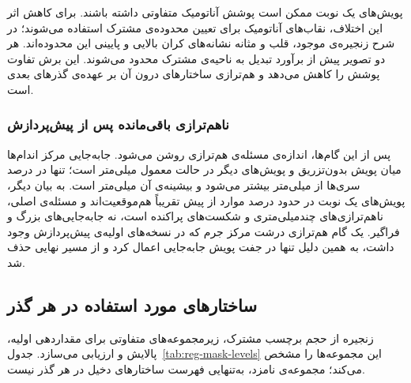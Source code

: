 پویش‌های یک نوبت ممکن است پوشش آناتومیک متفاوتی داشته باشند. برای کاهش اثر این اختلاف، نقاب‌های آناتومیک برای تعیین محدوده‌ی مشترک استفاده می‌شوند؛ در شرح زنجیره‌ی موجود، قلب و مثانه نشانه‌های کران بالایی و پایینی این محدوده‌اند. هر دو تصویر پیش از برآورد تبدیل به ناحیه‌ی مشترک محدود می‌شوند. این برش تفاوت پوشش را کاهش می‌دهد و هم‌ترازی ساختارهای درون آن بر عهده‌ی گذرهای بعدی است.

\subsubsection*{ناهم‌ترازی باقی‌مانده پس از پیش‌پردازش}

پس از این گام‌ها، اندازه‌ی مسئله‌ی هم‌ترازی روشن می‌شود. جابه‌جایی مرکز اندام‌ها میان پویش بدون‌تزریق و پویش‌های دیگر در حالت معمول  میلی‌متر است؛ تنها در  درصد سری‌ها از  میلی‌متر بیشتر می‌شود و بیشینه‌ی آن  میلی‌متر است. به بیان دیگر، پویش‌های یک نوبت در حدود  درصد موارد از پیش تقریباً هم‌موقعیت‌اند و مسئله‌ی اصلی، ناهم‌ترازی‌های چندمیلی‌متری و شکست‌های پراکنده است، نه جابه‌جایی‌های بزرگ و فراگیر. یک گام هم‌ترازی درشت مرکز جرم که در نسخه‌های اولیه‌ی پیش‌پردازش وجود داشت، به همین دلیل تنها در  جفت پویش جابه‌جایی اعمال کرد و از مسیر نهایی حذف شد.

\subsection{ساختارهای مورد استفاده در هر گذر}
\label{sec:m-reg-mask}

زنجیره از حجم برچسب مشترک، زیرمجموعه‌های متفاوتی برای مقداردهی اولیه، پالایش و ارزیابی می‌سازد. جدول~\ref{tab:reg-mask-levels} این مجموعه‌ها را مشخص می‌کند؛ مجموعه‌ی نامزد، به‌تنهایی فهرست ساختارهای دخیل در هر گذر نیست.

